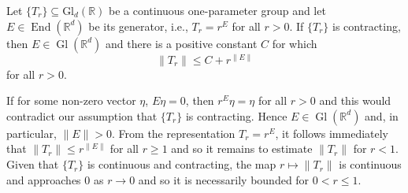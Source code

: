 \documentclass[smallextended]{svjour3}
\theoremstyle{remark}
\renewenvironment{proof}[1][\proofname]{\renewcommand\xproofname{#1}\xproof}{\endxproof}
\newcommand\End{\operatorname{End}} %
\newcommand\GldR{\mbox{Gl}_d(\mathbb{R})}%
\newcommand\Gl{\operatorname{Gl}} %
\begin{document}
\begin{lemma}\label{lem:OperatorBoundsforContractingGroup}
Let $\{T_r\}\subseteq\GldR$ be a continuous one-parameter group and let $E\in\End(\mathbb{R}^d)$ be its generator, i.e., $T_r=r^E$ for all $r>0$. If $\{T_r\}$ is contracting, then $E\in\Gl(\mathbb{R}^d)$ and there is a positive constant $C$ for which
\begin{equation*}
\|T_r\|\leq C+r^{\|E\|}
\end{equation*}
for all $r>0$.
\end{lemma}
\begin{proof}
If for some non-zero vector $\eta$, $E\eta=0$, then $r^E\eta=\eta$ for all $r>0$ and this would contradict our assumption that $\{T_r\}$ is contracting. Hence $E\in\Gl(\mathbb{R}^d)$ and, in particular, $\|E\|>0$. From the representation $T_r=r^E$, it follows immediately that $\|T_r\|\leq r^{\|E\|}$ for all $r\geq 1$ and so it remains to estimate $\|T_r\|$ for $r<1$. Given that $\{T_r\}$ is continuous and contracting, the map $r\mapsto \|T_r\|$ is continuous and approaches $0$ as $r\rightarrow 0$ and so it is necessarily bounded for $0<r\leq 1$.
\end{proof}
\end{document}
